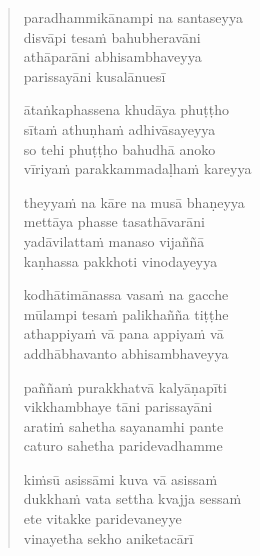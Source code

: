 \clearpage
\begin{verse}

paradhammikānampi na santaseyya\\
disvāpi tesaṁ bahubheravāni\\
athāparāni abhisambhaveyya\\
parissayāni kusalānuesī

ātaṅkaphassena khudāya phuṭṭho\\
sītaṁ athuṇhaṁ adhivāsayeyya\\
so tehi phuṭṭho bahudhā anoko\\
vīriyaṁ parakkammadaḷhaṁ kareyya

theyyaṁ na kāre na musā bhaṇeyya\\
mettāya phasse tasathāvarāni\\
yadāvilattaṁ manaso vijaññā\\
kaṇhassa pakkhoti vinodayeyya

kodhātimānassa vasaṁ na gacche\\
mūlampi tesaṁ palikhañña tiṭṭhe\\
athappiyaṁ vā pana appiyaṁ vā\\
addhābhavanto abhisambhaveyya

paññaṁ purakkhatvā kalyāṇapīti\\
vikkhambhaye tāni parissayāni\\
aratiṁ sahetha sayanamhi pante\\
caturo sahetha paridevadhamme

kiṁsū asissāmi kuva vā asissaṁ\\
dukkhaṁ vata settha kvajja sessaṁ\\
ete vitakke paridevaneyye\\
vinayetha sekho aniketacārī

\end{verse}


